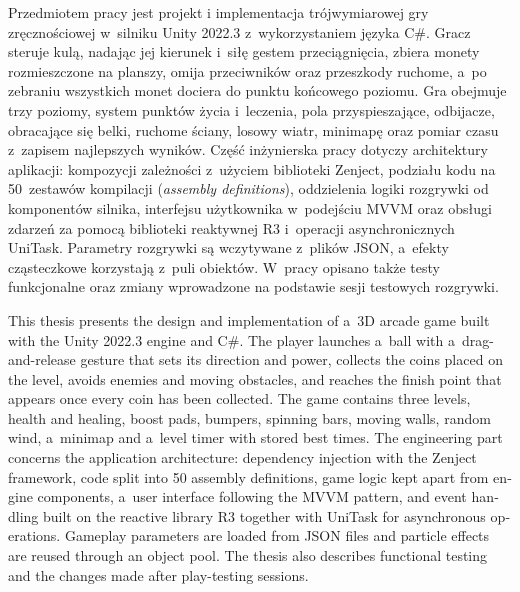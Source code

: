 \clearpage
\begingroup
{}
\vspace{10pt}

Przedmiotem pracy jest projekt i implementacja trójwymiarowej gry zręcznościowej
w~silniku Unity 2022.3 z~wykorzystaniem języka C\#. Gracz steruje
kulą, nadając jej kierunek i~siłę gestem przeciągnięcia, zbiera monety rozmieszczone na
planszy, omija przeciwników oraz przeszkody ruchome, a~po zebraniu wszystkich monet
dociera do punktu końcowego poziomu. Gra obejmuje trzy poziomy, system punktów życia
i~leczenia, pola przyspieszające, odbijacze, obracające się belki, ruchome ściany, losowy
wiatr, minimapę oraz pomiar czasu z~zapisem najlepszych wyników. Część inżynierska pracy
dotyczy architektury aplikacji: kompozycji zależności z~użyciem biblioteki Zenject, podziału
kodu na 50~zestawów kompilacji (\emph{assembly definitions}), oddzielenia logiki rozgrywki
od komponentów silnika, interfejsu użytkownika w~podejściu MVVM oraz obsługi zdarzeń
za pomocą biblioteki reaktywnej R3 i~operacji asynchronicznych UniTask. Parametry rozgrywki
są wczytywane z~plików JSON, a~efekty cząsteczkowe korzystają z~puli obiektów. W~pracy opisano także testy
funkcjonalne oraz zmiany wprowadzone na podstawie sesji testowych rozgrywki.

\vspace{18pt}
\vspace{10pt}

\begin{otherlanguage}{english}
This thesis presents the design and implementation of a~3D arcade
game built with the Unity 2022.3 engine and C\#. The player launches a~ball with
a~drag-and-release gesture that sets its direction and power, collects the coins placed on
the level, avoids enemies and moving obstacles, and reaches the finish point that appears
once every coin has been collected. The game contains three levels, health and healing,
boost pads, bumpers, spinning bars, moving walls, random wind, a~minimap and a~level timer
with stored best times. The engineering part concerns the application architecture:
dependency injection with the Zenject framework, code split into 50 assembly definitions,
game logic kept apart from engine components, a~user interface following the MVVM pattern,
and event handling built on the reactive library R3 together with UniTask for asynchronous
operations. Gameplay parameters are loaded from JSON files and particle effects are reused
through an object pool. The thesis also describes functional testing and the changes made after play-testing
sessions.
\end{otherlanguage}
\endgroup
\clearpage
